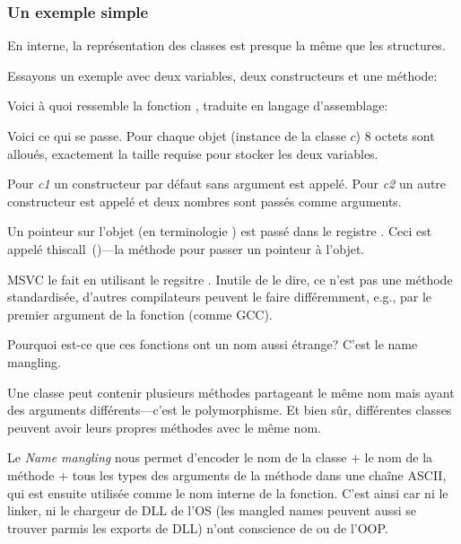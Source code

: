 \subsubsection{Un exemple simple}

En interne, la représentation des classes \Cpp est presque la même que les structures.

Essayons un exemple avec deux variables, deux constructeurs et une méthode:




Voici à quoi ressemble la fonction \main, traduite en langage d'assemblage:



Voici ce qui se passe.
Pour chaque objet (instance de la classe $c$) 8 octets sont alloués, exactement la
taille requise pour stocker les deux variables.

Pour \emph{c1} un constructeur par défaut sans argument  est appelé.
Pour \emph{c2} un autre constructeur  est appelé et deux nombres
sont passés comme arguments.

\label{thiscall}

Un pointeur sur l'objet (\ITthis en terminologie \Cpp) est passé dans le registre \ECX.
Ceci est appelé thiscall~()---la méthode pour passer un pointeur
à l'objet.

MSVC le fait en utilisant le regsitre \ECX. Inutile de le dire, ce n'est pas une
méthode standardisée, d'autres compilateurs peuvent le faire différemment, e.g.,
par le premier argument de la fonction (comme GCC).

\label{namemangling}

Pourquoi est-ce que ces fonctions ont un nom aussi étrange?
C'est le \gls{name mangling}.

Une classe \Cpp peut contenir plusieurs méthodes partageant le même nom mais ayant
des arguments différents---c'est le polymorphisme.
Et bien sûr, différentes classes peuvent avoir leurs propres méthodes avec le même nom.


Le \emph{Name mangling} nous permet d'encoder le nom de la classe + le nom de la méthode +
tous les types des arguments de la méthode dans une chaîne ASCII, qui est ensuite
utilisée comme le nom interne de la fonction.
C'est ainsi car ni le linker, ni le chargeur de DLL de l'\ac{OS} (les mangled names
peuvent aussi se trouver parmis les exports de DLL) n'ont conscience de \Cpp ou de
l'\ac{OOP}.

